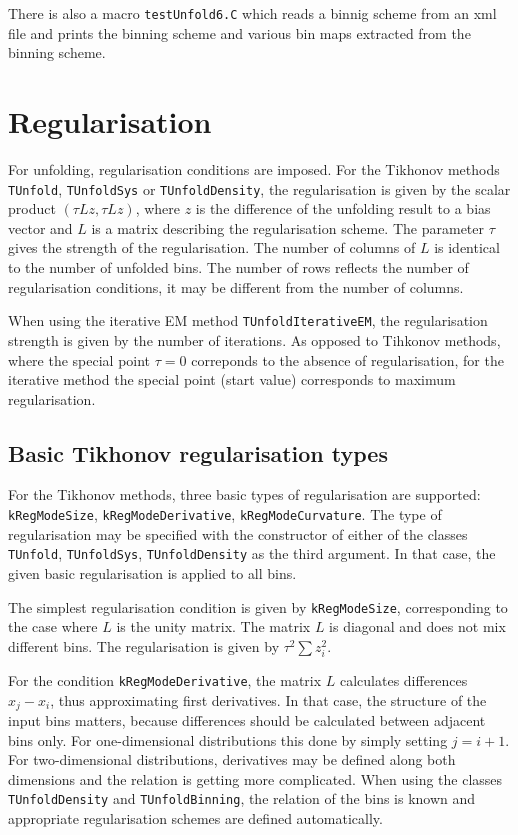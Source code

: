 \documentclass[12pt]{article}
\begin{document}
There is also a macro {\tt testUnfold6.C} which reads a binnig scheme
from an xml file and prints the binning scheme and various bin maps
extracted from the binning scheme.

\section{Regularisation}

For unfolding, regularisation conditions are imposed. For the Tikhonov
methods {\tt
  TUnfold}, {\tt TUnfoldSys} or {\tt TUnfoldDensity}, the 
regularisation is given by the scalar product
$\left(\tau Lz,\tau Lz\right)$, where $z$ is the difference of the unfolding
result to a bias vector and $L$ is a matrix describing the
regularisation scheme. The parameter $\tau$ gives the strength of the
regularisation. The number of columns of $L$ is identical to
the number of unfolded bins. The number of rows reflects the number of
regularisation conditions, it may be different from the number of
columns.

When using the iterative EM method {\tt TUnfoldIterativeEM}, the
regularisation strength is given by the number of iterations. As
opposed to Tihkonov methods, where the special point $\tau=0$
correponds to the absence of regularisation, for the iterative method
the special point (start value) corresponds to maximum
regularisation.

\subsection{Basic Tikhonov regularisation types}

For the Tikhonov methods,
three basic types of regularisation are supported: {\tt kRegModeSize},
{\tt kRegModeDerivative}, {\tt kRegModeCurvature}. The type of
regularisation may be specified with the constructor of either of the
classes {\tt TUnfold}, {\tt TUnfoldSys}, {\tt TUnfoldDensity} as the
third argument. In that case, the given basic regularisation is
applied to all bins.

The simplest regularisation condition is given by {\tt kRegModeSize},
corresponding to the case where $L$ is the unity matrix.
The matrix $L$ is diagonal and does not mix different bins. The
regularisation is given by $\tau^2\sum z_i^2$.

For the condition {\tt kRegModeDerivative}, the matrix $L$
calculates differences $x_j-x_i$, thus approximating first
derivatives. In that case, the structure of the input bins matters,
because differences should be calculated between adjacent bins
only. For one-dimensional distributions this done by simply setting
$j=i+1$. For two-dimensional distributions, derivatives may be defined
along both dimensions and the relation is getting more complicated.
When using the classes {\tt TUnfoldDensity} and {\tt TUnfoldBinning},
the relation of the bins is known and appropriate regularisation schemes are
defined automatically.
\end{document}
